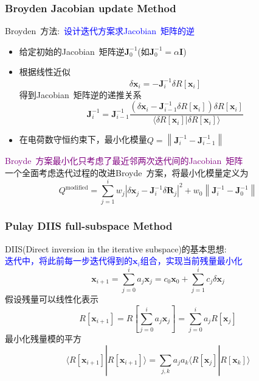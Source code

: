 \documentclass[cjk,slidestop,compress,mathserif,blue]{beamer}
\begin{document}
\frame
{
	\frametitle{\textrm{Broyden Jacobian update Method}}
	\textrm{Broyden~}方法:~\textcolor{blue}{设计迭代方案求\textrm{Jacobian~}矩阵的逆}
	\begin{itemize}
		\item 给定初始的\textrm{Jacobian~}矩阵逆$\mathbf{J}_0^{-1}$(如$\mathbf{J}_0^{-1}=\alpha\mathbf{I}$)
		\item 根据线性近似
			\begin{displaymath}
				\delta\mathbf{x}_{i}=-\mathbf{J}_i^{-1}\delta R[\mathbf{x}_{i}]
			\end{displaymath}
		得到\textrm{Jacobian~}矩阵逆的递推关系
			\begin{displaymath}
				\mathbf{J}_{i}^{-1}=\mathbf{J}_{i-1}^{-1}\dfrac{(\delta\mathbf{x}_i-\mathbf{J}_{i-1}^{-1}\delta R[\mathbf{x}_{i}])\delta R[\mathbf{x}_{i}]}{\langle\delta R[\mathbf{x}_{i}]|\delta R[\mathbf{x}_{i}]\rangle}
			\end{displaymath}
		\item 在电荷数守恒约束下，最小化模量$Q=\left\|\mathbf{J}_i^{-1}-\mathbf{J}_{i-1}^{-1}\right\|$
	\end{itemize}
	\textcolor{purple}{\textrm{Broyde~}方案最小化只考虑了最近邻两次迭代间的\textrm{Jacobian~}矩阵}\\
	一个全面考虑迭代过程的改进\textrm{Broyde~}方案，将最小化模量定义为
	\begin{displaymath}
		Q^{\mathrm{modified}}=\sum_{j=1}^{i}w_j|\delta\mathbf{x}_j-\mathbf{J}_i^{-1}\delta\mathbf{R}_j|^2+w_0\left\|\mathbf{J}_i^{-1}-\mathbf{J}_{0}^{-1}\right\|
	\end{displaymath}
}

\frame
{
	\frametitle{\textrm{Pulay DIIS full-subspace Method}}
	\textrm{DIIS(Direct inversion in the iterative subspace)}的基本思想:~\\
	\textcolor{blue}{迭代中，将此前每一步迭代得到的$\mathbf{x}_i$组合，实现当前残量最小化}
	\begin{displaymath}
		\mathbf{x}_{i+1}=\sum_{j=0}^ia_j\mathbf{x}_{j}=c_0\mathbf{x}_0+\sum_{j=1}^ic_j\delta\mathbf{x}_{j}
	\end{displaymath}
	假设残量可以线性化表示
	\begin{displaymath}
		R[\mathbf{x}_{i+1}]=R[\sum_{j=0}^ia_j\mathbf{x}_{j}]=\sum_{j=0}^ia_jR[\mathbf{x}_{j}]
	\end{displaymath}
	最小化残量模的平方
	\begin{displaymath}
		\langle R[\mathbf{x}_{i+1}]|R[\mathbf{x}_{i+1}]\rangle=\sum_{j,k}a_ja_k\langle R[\mathbf{x}_{j}]|R[\mathbf{x}_{k}]\rangle
	\end{displaymath}
}
\end{document}
